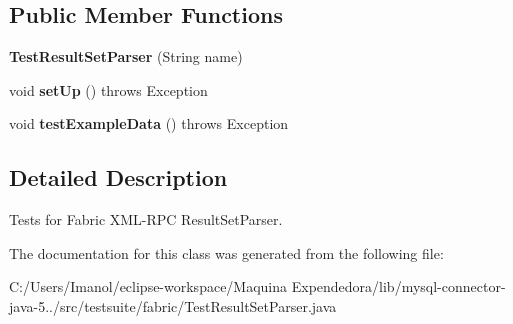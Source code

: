 \subsection*{Public Member Functions}
\begin{DoxyCompactItemize}
\item 
\mbox{\label{classtestsuite_1_1fabric_1_1_test_result_set_parser_a068b938c04b7c5d3659af7d832dd2469}} 
{\bfseries Test\+Result\+Set\+Parser} (String name)
\item 
\mbox{\label{classtestsuite_1_1fabric_1_1_test_result_set_parser_a85eb8fb1558f15cf5953abef3cfc4987}} 
void {\bfseries set\+Up} ()  throws Exception 
\item 
\mbox{\label{classtestsuite_1_1fabric_1_1_test_result_set_parser_a472c10f8f17abbc8e2b5ae7f3eec2147}} 
void {\bfseries test\+Example\+Data} ()  throws Exception 
\end{DoxyCompactItemize}


\subsection{Detailed Description}
Tests for Fabric X\+M\+L-\/\+R\+PC Result\+Set\+Parser. 

The documentation for this class was generated from the following file\+:\begin{DoxyCompactItemize}
\item 
C\+:/\+Users/\+Imanol/eclipse-\/workspace/\+Maquina Expendedora/lib/mysql-\/connector-\/java-\/5../src/testsuite/fabric/Test\+Result\+Set\+Parser.\+java\end{DoxyCompactItemize}
